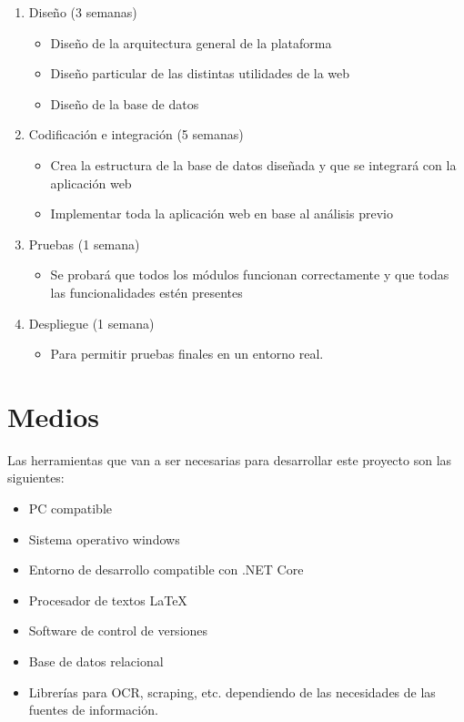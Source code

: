 \begin{enumerate}
\item Diseño (3 semanas)
  \begin{itemize}
  \item Diseño de la arquitectura general de la plataforma
  \item Diseño particular de las distintas utilidades de la web
  \item Diseño de la base de datos
  \end{itemize}
  
\item Codificaci\'on e integraci\'on (5 semanas)
  \begin{itemize}
  \item Crea la estructura de la base de datos diseñada y que se integrará con la aplicación web
  \item Implementar toda la aplicación web en base al análisis previo
  \end{itemize}

\item Pruebas (1 semana)
  \begin{itemize}
  \item Se probará que todos los módulos funcionan correctamente y que todas las funcionalidades estén presentes
  \end{itemize}

\item Despliegue  (1 semana)
  \begin{itemize}
  \item Para permitir pruebas finales en un entorno real.
  \end{itemize}

\end{enumerate}


\section{Medios}
\label{sec:medios}

Las herramientas que van a ser necesarias para desarrollar este proyecto
son las siguientes:

\begin{itemize}
\item PC compatible
\item Sistema operativo windows~\cite{windows}
\item Entorno de desarrollo compatible con .NET Core ~\cite{dotnetwhat} ~\cite{dotnet}
\item Procesador de textos \LaTeX~\cite{lamport94}
\item Software de control de versiones~\cite{git}
\item Base de datos relacional
\item Librerías para OCR, scraping, etc. dependiendo de las necesidades de las fuentes de información.
\end{itemize}




